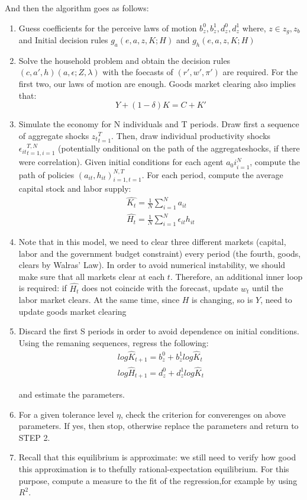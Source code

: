 And then the algorithm goes as follows:
\begin{enumerate}
\item Guess coefficients for the perceive laws of motion $b^0_z, b^1_z, d^0_z, d^1_z$ where, $z\in{z_g,z_b}$ and Initial decision rules $g_a (e,a,z,K;H)$ and $g_h (e,a,z,K;H)$
\item Solve  the  household  problem  and  obtain  the  decision  rules $(c,a',h)(a,\epsilon;Z,\lambda)$ with the foecasts of $(r',w',\pi')$ are required. For the first two, our laws of motion are enough. Goods market clearing also implies that: 
\[ Y + (1-\delta)K = C + K' \]
\item Simulate the economy for N individuals and T periods. Draw first a sequence of aggregate shocks ${z_t}_{t=1}^T$. Then, draw individual productivity shocks ${\epsilon_{it}}_{t=1,i=1}^{T,N}$ (potentially onditional on the path of the aggregateshocks, if there were correlation).  Given initial conditions for each agent ${a_0i}^N_{i=1}$, compute the path of policies ${(a_{it}, h_{it})}_{i=1,t=1}^{N,T}$. For each period, compute the average capital stock and labor supply:
\begin{align}
\hat{K_t} = \frac{1}{N} \sum_{i=1}^N a_{it} \\
\hat{H_t} = \frac{1}{N} \sum_{i=1}^N \epsilon_{it} h_{it}
\end{align}
\item Note that in this model, we need to clear three different markets (capital, labor and the government budget constraint) every period (the fourth, goods, clears by Walras’ Law).  In order to avoid numerical instability, we should make sure that all markets clear at each $t$.  Therefore, an additional inner loop is required:  if $\hat{H_t}$ does not coincide with the forecast, update $w_t$ until the labor market clears.  At the same time, since $H$ is changing, so is $Y$, need to update goods market clearing 

\item Discard the first S periods in order to avoid dependence on initial conditions. Using the remaning sequences, regress the following:
\begin{align}
log \hat{K}_{t+1} = b^0_z + b^1_z log \hat{K}_{t} \\
log \hat{H}_{t+1} = d^0_z + d^1_z log \hat{K}_{t} 
\end{align}

and estimate the parameters. 

\item For a given tolerance level $\eta$, check the criterion for converenges on above parameters. If yes, then stop, otherwise replace the parameters and return to STEP 2. 

\item  Recall that this equilibrium is approximate:  we still need to verify how good this approximation is to thefully rational-expectation equilibrium.  For this purpose, compute a measure to the fit of the regression,for example by using $R^2$. 
\end{enumerate}



